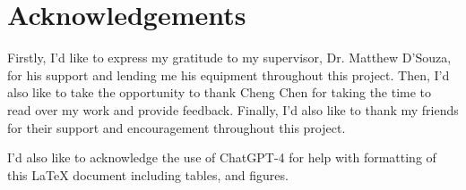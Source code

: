 \section{Acknowledgements}

Firstly, I'd like to express my gratitude to my supervisor, Dr. Matthew D'Souza, for his support and lending me his equipment throughout this project. Then, I'd also like to take the opportunity to thank Cheng Chen for taking the time to read over my work and provide feedback. Finally, I'd also like to thank my friends for their support and encouragement throughout this project. 

I'd also like to acknowledge the use of ChatGPT-4 for help with formatting of this LaTeX document including tables, and figures. 

